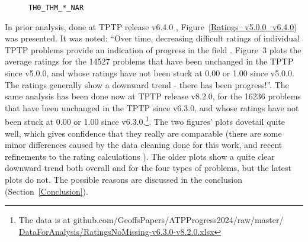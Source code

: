 \documentclass[runningheads]{llncs}
\begin{document}
\begin{figure}[h!]
\begin{minipage}[t]{.49\textwidth}
  \vspace*{-2em}
  \caption{{\tt TH0\_THM\_*\_NAR}}
  \label{Plot_TH0_THM_NAR}
\end{minipage}
\end{figure}

In prior analysis, done at TPTP release v6.4.0 \cite{Sut17}, Figure~\ref{Ratings_v5.0.0_v6.4.0} 
was presented. 
It was noted: ``Over time, decreasing difficult ratings of individual TPTP problems provide an 
indication of progress in the field \cite{SFS01}. Figure~3 plots the average ratings for the 
14527 problems that have been unchanged in the TPTP since v5.0.0, and whose ratings have not 
been stuck at 0.00 or 1.00 since v5.0.0. The ratings generally show a downward trend - there 
has been progress!''.
The same analysis has been done now at TPTP release v8.2.0, for the 16236 problems that have been 
unchanged in the TPTP since v6.3.0, and whose ratings have not been stuck at 0.00 or 1.00 since 
v6.3.0.\footnote{%
The data is at github.com/GeoffsPapers/ATPProgress2024/raw/master/
\href{https://github.com/GeoffsPapers/ATPProgress2024/raw/master/DataForAnalysis/RatingsNoMissing-v6.3.0-v8.2.0.xlsx}{DataForAnalysis/RatingsNoMissing-v6.3.0-v8.2.0.xlsx}}.
The two figures' plots dovetail quite well, which gives confidence that they really are comparable
(there are some minor differences caused by the data cleaning done for this work, and recent 
refinements to the rating calculations \cite{SD23-CASC,SD24-CASC}).
The older plots show a quite clear downward trend both overall and for the four types of problems,
but the latest plots do not.
The possible reasons are discussed in the conclusion (Section~\ref{Conclusion}).
\end{document}
